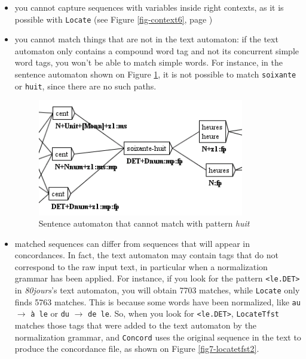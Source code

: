 \begin{itemize}
    \item you cannot capture sequences with variables inside right contexts, as
    it is possible with \verb+Locate+ (see Figure \ref{fig-context6},
    page \pageref{fig-context6})
    
    \item you cannot match things that are not in the text automaton: 
    if the text automaton only contains a compound word tag and not
    its concurrent simple word tags, you won't be able to match simple words.
    For instance, in the sentence automaton shown on Figure
    \ref{fig7-locatetfst1}, it is not possible to match \verb+soixante+
    or \verb+huit+, since there are no such paths.
    
\begin{figure}[!ht]
\begin{center}
\includegraphics[width=9cm]{resources/img/fig7-locatetfst1.png}
\caption{Sentence automaton that cannot match with
pattern \textit{huit}\label{fig7-locatetfst1}}
\end{center}
\end{figure}

    \item matched sequences can differ from sequences that will appear in
    concordances. In fact, the text automaton may contain tags that do not
    correspond to the raw input text, in particular when a normalization grammar
    has been applied. For instance, if you look for the pattern \verb+<le.DET>+
    in \textit{80jours}'s text automaton, you will obtain 7703 matches, while
    \verb+Locate+ only finds 5763 matches. This is because some words have been normalized,
    like \verb+au+ $\rightarrow$ \texttt{\`a le} or \verb+du+ $\rightarrow$
    \verb+de le+. So, when you look for \verb+<le.DET>+, \verb+LocateTfst+
    matches those tags that were added to the text automaton by the
    normalization grammar, and \verb+Concord+ uses the original sequence in the
    text to produce the concordance file, as shown on Figure
    \ref{fig7-locatetfst2}.


\end{itemize}
